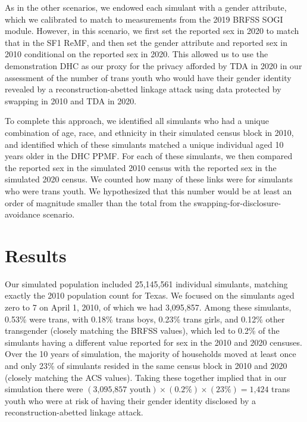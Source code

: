 \documentclass{jpc} %
\theoremstyle{plain}\newtheorem{satz}[thm]{Satz} %
\begin{document}
As in the other scenarios, we endowed each simulant with a gender attribute, which we calibrated to match to measurements from the 2019 BRFSS SOGI module. However, in this scenario, we first set the reported sex in 2020 to match that in the SF1 ReMF, and then set the gender attribute and reported sex in 2010 conditional on the reported sex in 2020.  This allowed us to use the demonstration DHC as our proxy for the privacy afforded by TDA in 2020 in our assessment of the number of trans youth who would have their gender identity revealed by a reconstruction-abetted linkage attack using data protected by swapping in 2010 and TDA in 2020.

To complete this approach, we identified all simulants who had a unique combination of age, race, and ethnicity in their simulated census block in 2010, and identified which of these simulants matched a unique individual aged 10 years older in the DHC PPMF.  For each of these simulants, we then compared the reported sex in the simulated 2010 census with the reported sex in the simulated 2020 census. We counted how many of these links were for simulants who were trans youth.  We hypothesized that this number would be at least an order of magnitude smaller than the total from the swapping-for-disclosure-avoidance scenario.

\section*{Results}

Our simulated population included 25,145,561 individual simulants, matching exactly the 2010 population count for Texas.  We focused on the simulants aged zero to 7 on April 1, 2010, of which we had 3,095,857.
Among these simulants, 0.53\% were trans, with 0.18\% trans boys, 0.23\% trans girls, and 0.12\% other transgender (closely matching the BRFSS values), which led to 0.2\% of the simulants having a different value reported for sex in the 2010 and 2020 censuses.
Over the 10 years of simulation, the majority of households moved at least once and only 23\% of simulants resided in the same census block in 2010 and 2020 (closely matching the ACS values).
Taking these together implied that in our simulation there were $(\text{3,095,857} \text{ youth}) \times (0.2\%) \times (23\%) = \text{1,424}$ trans youth who were at risk of having their gender identity disclosed by a reconstruction-abetted linkage attack.
\end{document}
